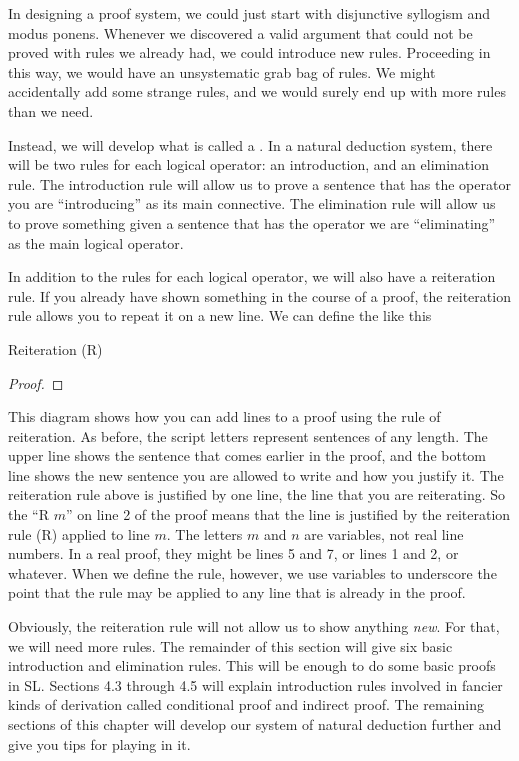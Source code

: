 In designing a proof system, we could just start with disjunctive syllogism and modus ponens. Whenever we discovered a valid argument that could not be proved with rules we already had, we could introduce new rules. Proceeding in this way, we would have an unsystematic grab bag of rules. We might accidentally add some strange rules, and we would surely end up with more rules than we need.

Instead, we will develop what is called a . In a natural deduction system, there will be two rules for each logical operator: an introduction, and an elimination rule. The introduction rule will allow us to prove a sentence that has the operator you are ``introducing'' as its main connective. The elimination rule will allow us to prove something given a sentence that has the operator we are ``eliminating'' as the main logical operator.

In addition to the rules for each logical operator, we will also have a reiteration rule. If you already have shown something in the course of a proof, the reiteration rule allows you to repeat it on a new line. We can define the  like this

Reiteration (R)
\begin{proof}
	 
\end{proof}

This diagram shows how you can add lines to a proof using the rule of reiteration. As before, the script letters represent sentences of any length. The upper line shows the sentence that comes earlier in the proof, and the bottom line shows the new sentence you are allowed to write and how you justify it. The reiteration rule above is justified by one line, the line that you are reiterating. So the ``R $m$'' on line 2 of the proof means that the line is justified by the reiteration rule (R) applied to line $m$. The letters $m$ and $n$ are variables, not real line numbers. In a real proof, they might be lines 5 and 7, or lines 1 and 2, or whatever. When we define the rule, however, we use variables to underscore the point that the rule may be applied to any line that is already in the proof. 

Obviously, the reiteration rule will not allow us to show anything \emph{new}. For that, we will need more rules. The remainder of this section will give six basic introduction and elimination rules. This will be enough to do some basic proofs in SL. Sections 4.3 through 4.5 will explain introduction rules involved in fancier kinds of derivation called conditional proof and indirect proof. The remaining sections of this chapter will develop our system of natural deduction further and give you tips for playing in it.

